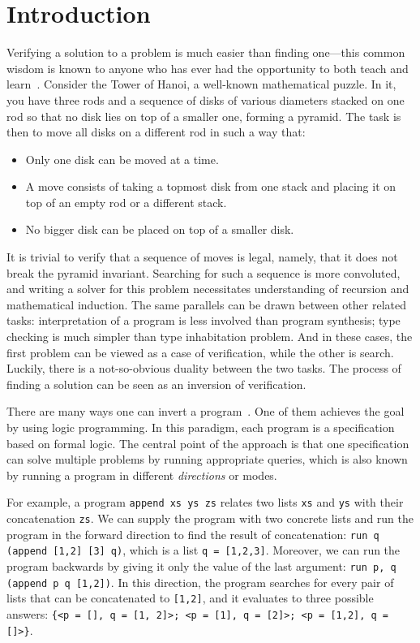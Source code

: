 \section{Introduction}

Verifying a solution to a problem is much easier than finding one---this common wisdom is known to anyone who has ever had the opportunity to both teach and learn~\cite{lozov2019relational}. 
Consider the Tower of Hanoi, a well-known mathematical puzzle. 
In it, you have three rods and a sequence of disks of various diameters stacked on one rod so that no disk lies on top of a smaller one, forming a pyramid.
The task is then to move all disks on a different rod in such a way that: 
\begin{itemize}
    \item Only one disk can be moved at a time.
    \item A move consists of taking a topmost disk from one stack and placing it on top of an empty rod or a different stack.
    \item No bigger disk can be placed on top of a smaller disk. 
\end{itemize}

It is trivial to verify that a sequence of moves is legal, namely, that it does not break the pyramid invariant. 
Searching for such a sequence is more convoluted, and writing a solver for this problem necessitates understanding of recursion and mathematical induction. 
The same parallels can be drawn between other related tasks: interpretation of a program  is less involved than program synthesis; type checking is much simpler than type inhabitation problem.  
And in these cases, the first problem can be viewed as a case of verification, while the other is search. 
Luckily, there is a not-so-obvious duality between the two tasks.
The process of finding a solution can be seen as an inversion of verification.

There are many ways one can invert a program~\cite{SemanticsModifiers1,RevURA,aman2020foundations}. 
One of them achieves the goal by using logic programming. 
In this paradigm, each program is a specification based on formal logic. 
The central point of the approach is that one specification can solve multiple problems by running appropriate queries, which is also known by running a program in different \emph{directions} or modes. 

For example, a program \texttt{append xs ys zs} relates two lists \texttt{xs} and \texttt{ys} with their concatenation \texttt{zs}. 
We can supply the program with two concrete lists and run the program in the forward direction to find the result of concatenation: \texttt{run q (append [1,2] [3] q)}, which is a list \texttt{q = [1,2,3]}. 
Moreover, we can run the program backwards by giving it only the value of the last argument: \texttt{run p, q (append p q [1,2])}.
In this direction, the program searches for every pair of lists that can be concatenated to \texttt{[1,2]}, and it evaluates to three possible answers: \texttt{\{<p = [], q = [1, 2]>; <p = [1], q = [2]>; <p = [1,2], q = []>\}}. 

